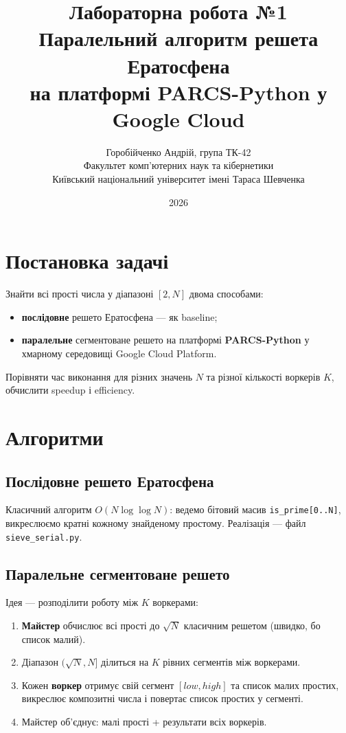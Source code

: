 \documentclass[12pt,a4paper]{article}
\title{\textbf{Лабораторна робота №1}\\[0.3cm]
\large Паралельний алгоритм решета Ератосфена\\на платформі PARCS-Python у Google Cloud}
\author{Горобійченко Андрій, група ТК-42\\
Факультет комп'ютерних наук та кібернетики\\
Київський національний університет імені Тараса Шевченка}
\date{2026}
\begin{document}
\maketitle

\section{Постановка задачі}

Знайти всі прості числа у діапазоні $[2, N]$ двома способами:
\begin{itemize}
    \item \textbf{послідовне} решето Ератосфена — як baseline;
    \item \textbf{паралельне} сегментоване решето на платформі \textbf{PARCS-Python} у хмарному середовищі Google Cloud Platform.
\end{itemize}

Порівняти час виконання для різних значень $N$ та різної кількості воркерів $K$, обчислити speedup і efficiency.

\section{Алгоритми}

\subsection{Послідовне решето Ератосфена}

Класичний алгоритм $O(N \log \log N)$: ведемо бітовий масив \texttt{is\_prime[0..N]}, викреслюємо кратні кожному знайденому простому. Реалізація — файл \texttt{sieve\_serial.py}.

\subsection{Паралельне сегментоване решето}

Ідея — розподілити роботу між $K$ воркерами:

\begin{enumerate}
    \item \textbf{Майстер} обчислює всі прості до $\sqrt{N}$ класичним решетом (швидко, бо список малий).
    \item Діапазон $(\sqrt{N}, N]$ ділиться на $K$ рівних сегментів між воркерами.
    \item Кожен \textbf{воркер} отримує свій сегмент $[low, high]$ та список малих простих, викреслює композитні числа і повертає список простих у сегменті.
    \item Майстер об'єднує: малі прості + результати всіх воркерів.
\end{enumerate}
\end{document}
